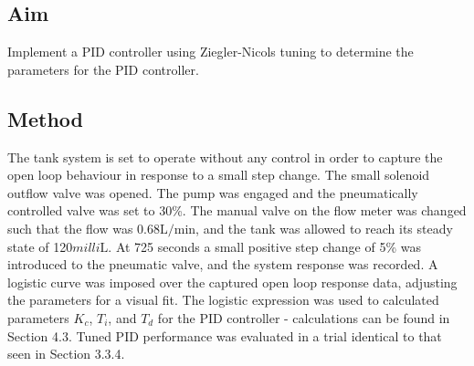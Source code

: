 \documentclass{article}
\begin{document}
\subsection{Aim}
Implement a PID controller using Ziegler-Nicols tuning to determine the parameters for the PID controller.

\subsection{Method}
The tank system is set to operate without any control in order to capture the open loop behaviour in response to a small step change. The small solenoid outflow valve was opened. The pump was engaged and the pneumatically controlled valve was set to 30\%. The manual valve on the flow meter was changed such that the flow was $0.68\si{\liter\per\minute}$, and the tank was allowed to reach its steady state of 120$\si{milli\liter}$. At 725 seconds a small positive step change of 5\% was introduced to the pneumatic valve, and the system response was recorded. A logistic curve was imposed over the captured open loop response data, adjusting the parameters for a visual fit. The logistic expression was used to calculated parameters $K_c$, $T_i$, and $T_d$ for the PID controller - calculations can be found in Section 4.3. Tuned PID performance was evaluated in a trial identical to that seen in Section 3.3.4.  
\end{document}

